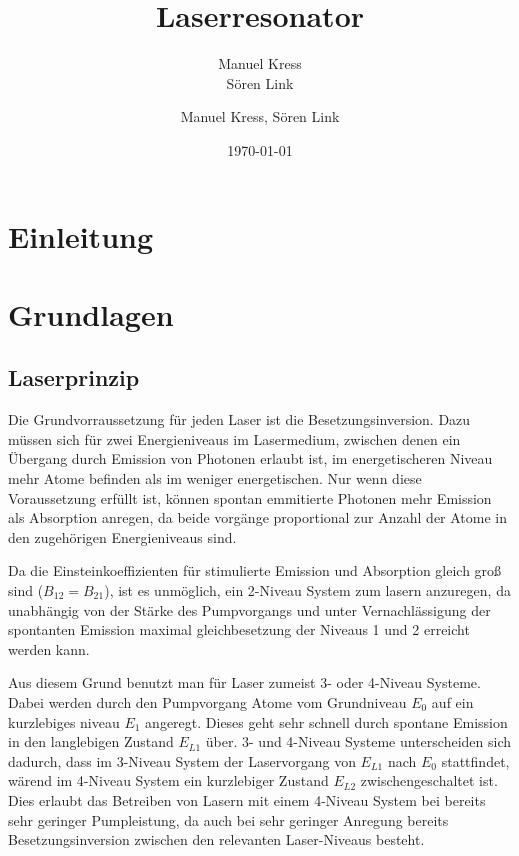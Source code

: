 \documentclass[bigchapter,colorback,accentcolor=tud4b,linedtoc,11pt]{tudreport}
\title{Laserresonator}
\subtitle{Manuel Kress  \\Sören Link}
\author{Manuel Kress, Sören Link}
\date{\today}
\numberwithin{equation}{subsection}
\begin{document}

\maketitle

\tableofcontents


\chapter{Einleitung}

\chapter{Grundlagen}
\section{Laserprinzip}
Die Grundvorraussetzung für jeden Laser ist die Besetzungsinversion. Dazu müssen sich für zwei Energieniveaus im Lasermedium, zwischen denen ein Übergang durch Emission von Photonen erlaubt ist, im energetischeren Niveau mehr Atome befinden als im weniger energetischen. Nur wenn diese Voraussetzung erfüllt ist, können spontan emmitierte Photonen mehr Emission als Absorption anregen, da beide vorgänge proportional zur Anzahl der Atome in den zugehörigen Energieniveaus sind.

Da die Einsteinkoeffizienten für stimulierte Emission und Absorption gleich groß sind ($B_{12}=B_{21}$), ist es unmöglich, ein 2-Niveau System zum lasern anzuregen, da unabhängig von der Stärke des Pumpvorgangs und unter Vernachlässigung der spontanten Emission maximal gleichbesetzung der Niveaus 1 und 2 erreicht werden kann.

Aus diesem Grund benutzt man für Laser zumeist 3- oder 4-Niveau Systeme. Dabei werden durch den Pumpvorgang Atome vom Grundniveau $E_0$ auf ein kurzlebiges niveau $E_1$ angeregt. Dieses geht sehr schnell durch spontane Emission in den langlebigen Zustand $E_{L1}$ über. 3- und 4-Niveau Systeme unterscheiden sich dadurch, dass im 3-Niveau System der Laservorgang von $E_{L1}$ nach $E_{0}$ stattfindet, wärend im 4-Niveau System ein kurzlebiger Zustand $E_{L2}$ zwischengeschaltet ist. Dies erlaubt das Betreiben von Lasern mit einem 4-Niveau System bei bereits sehr geringer Pumpleistung, da auch bei sehr geringer Anregung bereits Besetzungsinversion zwischen den relevanten Laser-Niveaus besteht.
\end{document}
